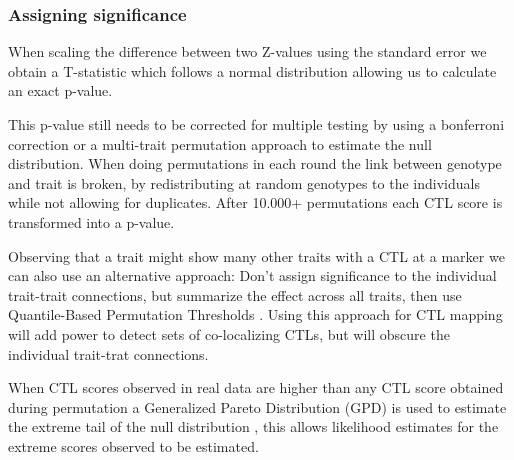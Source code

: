   \subsubsection{Assigning significance}
  
  When scaling the difference between two Z-values using the standard error we obtain a T-statistic which follows a 
  normal distribution \cite{Biometry:1995} allowing us to calculate an exact p-value.

  This p-value still needs to be corrected for multiple testing by using a bonferroni correction or a multi-trait 
  permutation approach \cite{Breitling:2008a} to estimate the null distribution. When doing permutations in each round 
  the link between genotype and trait is broken, by redistributing at random genotypes to the individuals while not 
  allowing for duplicates. After 10.000+ permutations each CTL score is transformed into a p-value.

  Observing that a trait might show many other traits with a CTL at a marker we can also use an alternative approach: 
  Don't assign significance to the individual trait-trait connections, but summarize the effect across all traits, 
  then use Quantile-Based Permutation Thresholds \cite{Neto:2012}. Using this approach for CTL mapping will add power 
  to detect sets of co-localizing CTLs, but will obscure the individual trait-trat connections.

  When CTL scores observed in real data are higher than any CTL score obtained during permutation a Generalized 
  Pareto Distribution (GPD) is used to estimate the extreme tail of the null distribution \cite{Knijnenburg:2009}, 
  this allows likelihood estimates for the extreme scores observed to be estimated.
  
